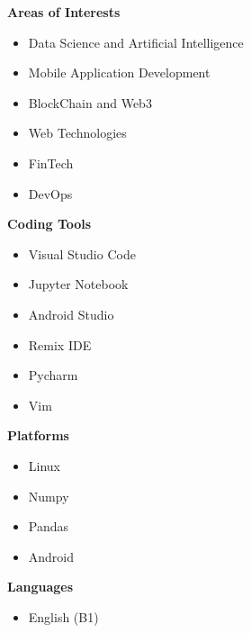 \documentclass[a4paper,11pt]{article}
\begin{document}
\vspace{0.5em}
\noindent
\begin{minipage}[t]{0.48\textwidth}
    \textbf{Areas of Interests}
    \vspace{0.3em}
    \begin{itemize}[leftmargin=2em]
        \item Data Science and Artificial Intelligence
        \item Mobile Application Development
        \item BlockChain and Web3
        \item Web Technologies
        \item FinTech
        \item DevOps
    \end{itemize}
\end{minipage}%
\hfill
\begin{minipage}[t]{0.48\textwidth}
    \textbf{Coding Tools}
    \vspace{0.3em}
    \begin{itemize}[leftmargin=2em]
        \item Visual Studio Code
        \item Jupyter Notebook
        \item Android Studio
        \item Remix IDE
        \item Pycharm
        \item Vim
    \end{itemize}
\end{minipage}


\vspace{0.5em}
\noindent
\begin{minipage}[t]{0.48\textwidth}
    \textbf{Platforms}
    \vspace{0.3em}
    \begin{itemize}[leftmargin=2em]
        \item Linux
        \item Numpy
        \item Pandas
        \item Android
    \end{itemize}
\end{minipage}%
\hfill
\begin{minipage}[t]{0.48\textwidth}
    \textbf{Languages}
    \vspace{0.3em}
    \begin{itemize}[leftmargin=2em]
        \item English (B1)
    \end{itemize}
\end{minipage}
\end{document}
